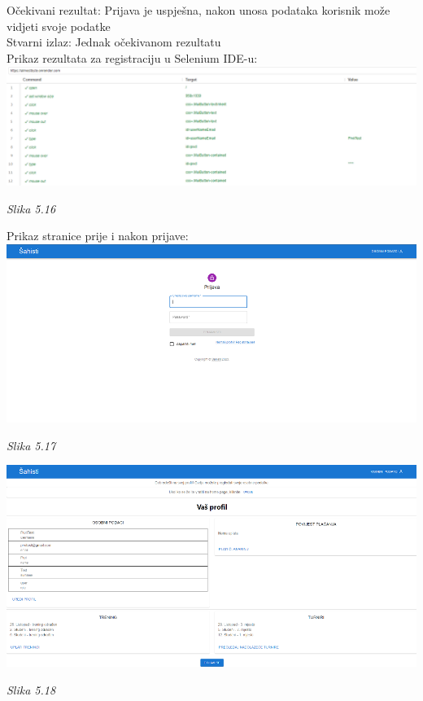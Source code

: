 \documentclass{article}
\begin{document}
	Očekivani rezultat: Prijava je uspješna, nakon unosa podataka korisnik može vidjeti svoje podatke\\
	Stvarni izlaz: Jednak očekivanom rezultatu\\
	Prikaz rezultata za registraciju u Selenium IDE-u:\\
	
	\includegraphics[width=\columnwidth]{login}
	\begin{center}
		\textit{Slika 5.16}
	\end{center}
	\eject
	Prikaz stranice prije i nakon prijave:\\
	
	\includegraphics[width=\columnwidth]{prijava-prije}
	\begin{center}
		\textit{Slika 5.17}
	\end{center}
	\includegraphics[width=\columnwidth]{prijava-nakon}
	\begin{center}
		\textit{Slika 5.18}
	\end{center}
	\eject
	
\end{document}
